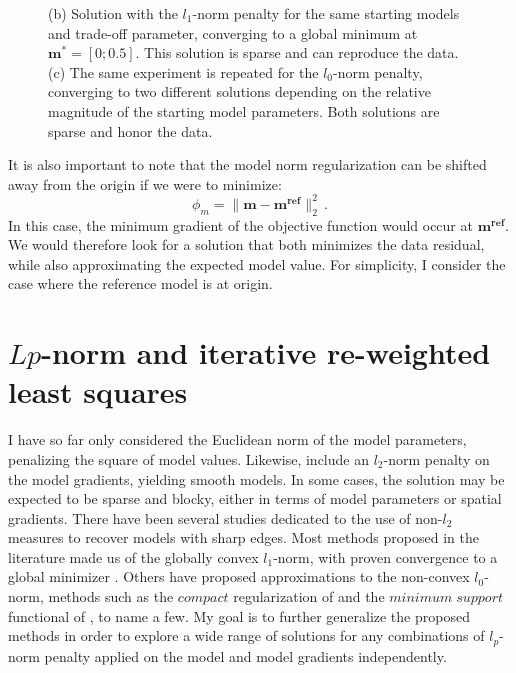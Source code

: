 \begin{figure}[h!]
{(b) Solution with the $l_1$-norm penalty for the same starting models and trade-off parameter, converging to a global minimum at $\mathbf{m}^*=[0;0.5]$. This solution is sparse and can reproduce the data.
(c) The same experiment is repeated for the $l_0$-norm penalty, converging to two different solutions depending on the relative magnitude of the starting model parameters. Both solutions are sparse and honor the data. }
\label{fig:IRLS_toy_result}
\end{figure}

It is also important to note that the model norm regularization can be shifted away from the origin if we were to minimize:
\begin{equation}
\phi_m = \| \mathbf{m - m^{ref}} \|_2^2 \,.
\end{equation}
In this case, the minimum gradient of the objective function would occur at $\mathbf{m^{ref}}$. 
We would therefore look for a solution that both minimizes the data residual, while also approximating the expected model value. For simplicity, I consider the case where the reference model is at origin.

\section{$Lp$-norm and iterative re-weighted least squares} 
I have so far only considered the Euclidean norm of the model parameters,  penalizing the square of model values. 
Likewise, \cite{LiOldenburg1996} include an $l_2$-norm penalty on the model gradients, yielding smooth models.
In some cases, the solution may be expected to be sparse and blocky, either in terms of model parameters or spatial gradients. 
There have been several studies dedicated to the use of non-$l_2$ measures to recover models with sharp edges.
Most methods proposed in the literature made us of the globally convex $l_1$-norm, with proven convergence to a global minimizer \cite[]{FarquharsonOldenburg98, SunLi14, Daubechies10}.
Others have proposed approximations to the non-convex $l_0$-norm, methods such as the $compact$ regularization of \cite{ LastKubik83} and the $minimum\;support$ functional of \cite{Portniaguine1999}, to name a few.
My goal is to further generalize the proposed methods in order to explore a wide range of solutions for any combinations of $l_p$-norm penalty applied on the model and model gradients independently.

